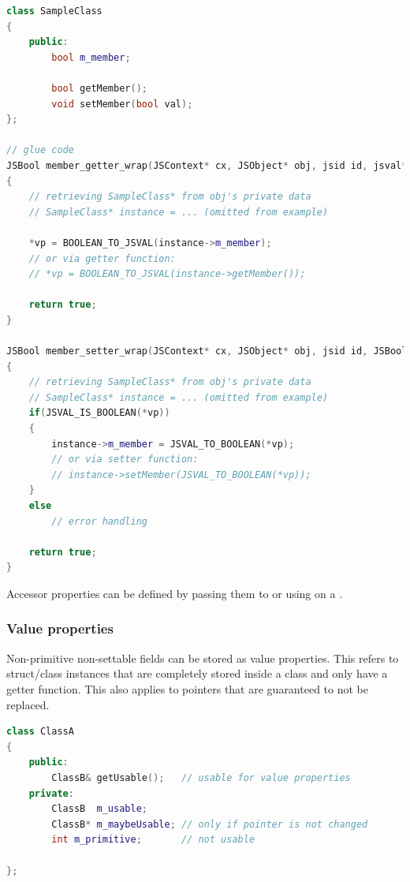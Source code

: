 \SingleSpacing
\begin{lstlisting}[language=C++, caption=Glue code for accessor properties]
class SampleClass
{
	public:
		bool m_member;
		
		bool getMember();
		void setMember(bool val);
};

// glue code
JSBool member_getter_wrap(JSContext* cx, JSObject* obj, jsid id, jsval* vp)
{
	// retrieving SampleClass* from obj's private data
	// SampleClass* instance = ... (omitted from example)
	
	*vp = BOOLEAN_TO_JSVAL(instance->m_member);
	// or via getter function: 		
	// *vp = BOOLEAN_TO_JSVAL(instance->getMember());

	return true;
}

JSBool member_setter_wrap(JSContext* cx, JSObject* obj, jsid id, JSBool strict, jsval* vp)
{
	// retrieving SampleClass* from obj's private data
	// SampleClass* instance = ... (omitted from example)
	if(JSVAL_IS_BOOLEAN(*vp))
	{
		instance->m_member = JSVAL_TO_BOOLEAN(*vp);
		// or via setter function: 		
		// instance->setMember(JSVAL_TO_BOOLEAN(*vp));
	}
	else
		// error handling

	return true;
}
\end{lstlisting}
\OnehalfSpacing

Accessor properties can be defined by passing them to  or using \linebreak{} on a .

\subsubsection{Value properties}
\label{sec:ValueProperties}

Non-primitive non-settable fields can be stored as value properties. This refers to struct/class instances that are completely stored inside a class and only have a getter function. This also applies to pointers that are guaranteed to not be replaced.

\SingleSpacing
\begin{lstlisting}[language=C++, caption=Fields usable for value properties]
class ClassA
{
	public:
		ClassB& getUsable();   // usable for value properties
	private:
		ClassB  m_usable;  
		ClassB* m_maybeUsable; // only if pointer is not changed
		int m_primitive;       // not usable

};
\end{lstlisting}
\OnehalfSpacing

